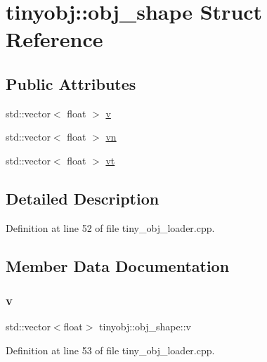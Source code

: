 \hypertarget{structtinyobj_1_1obj__shape}{}\section{tinyobj\+:\+:obj\+\_\+shape Struct Reference}
\label{structtinyobj_1_1obj__shape}
\subsection*{Public Attributes}
\begin{DoxyCompactItemize}
\item 
std\+::vector$<$ float $>$ \hyperlink{structtinyobj_1_1obj__shape_ad088c2525809a91953fca51798f64b89}{v}
\item 
std\+::vector$<$ float $>$ \hyperlink{structtinyobj_1_1obj__shape_ac87ced8cdff16da62a202bd390e77a8e}{vn}
\item 
std\+::vector$<$ float $>$ \hyperlink{structtinyobj_1_1obj__shape_a2d6dcc97e66ca2596dd50236c899b456}{vt}
\end{DoxyCompactItemize}


\subsection{Detailed Description}


Definition at line 52 of file tiny\+\_\+obj\+\_\+loader.\+cpp.



\subsection{Member Data Documentation}
\mbox{\label{structtinyobj_1_1obj__shape_ad088c2525809a91953fca51798f64b89}} 
\subsubsection{\texorpdfstring{v}{v}}
{\footnotesize\ttfamily std\+::vector$<$float$>$ tinyobj\+::obj\+\_\+shape\+::v}



Definition at line 53 of file tiny\+\_\+obj\+\_\+loader.\+cpp.

\mbox{\label{structtinyobj_1_1obj__shape_ac87ced8cdff16da62a202bd390e77a8e}} 
